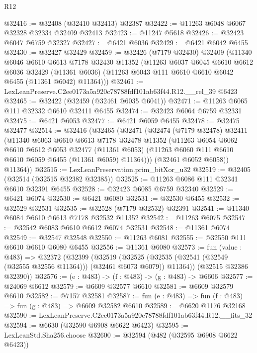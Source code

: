 \begin{lexlean}{R12}
\begin{coremodule}
@32416 := @32408 (@32410 @32413) @32387
@32422 := @11263 @6048 @6067 @32328 @32334 @32409 @32413
@32423 := @11247 @5618
@32426 := @32423 @6047 @6759 @32327
@32427 := @6421 @6036
@32429 := @6421 @6042 @6455
@32430 := @32427 @32429
@32459 := @32426
    (@7179 @32430)
    @32409
    (@11340
      @6046
      @6610
      @6613
      @7178
      @32430
      @11352
      (@11263
        @6037
        @6045
        @6610
        @6612
        @6036
        @32429
        (@11361 @6036)
        (@11263 @6043 @111 @6610 @6610 @6042 @6455 (@11361 @6042) @11364)))
@32461 := LexLeanPreserve.C2ee0173a5a920c78788fdf101ab63f44.R12.__rel_39 @6423
@32465 := @32422 (@32459 (@32461 @6035 @6041))
@32471 := @11263 @6065 @111 @32332 @6610 @32411 @6455
@32474 := @32423 @6064 @6759 @32331
@32475 := @6421 @6053
@32477 := @6421 @6059 @6455
@32478 := @32475 @32477
@32514 := @32416
    (@32465
      (@32471
        (@32474
          (@7179 @32478)
          @32411
          (@11340
            @6063
            @6610
            @6613
            @7178
            @32478
            @11352
            (@11263
              @6054
              @6062
              @6610
              @6612
              @6053
              @32477
              (@11361 @6053)
              (@11263 @6060 @111 @6610 @6610 @6059 @6455 (@11361 @6059) @11364)))
          (@32461 @6052 @6058))
        @11364))
@32515 := LexLeanPreservation.prim_bitXor_u32
@32519 := @32405 (@32514 (@32515 @32382 @32385))
@32525 := @11263 @6086 @111 @32341 @6610 @32391 @6455
@32528 := @32423 @6085 @6759 @32340
@32529 := @6421 @6074
@32530 := @6421 @6080
@32531 := @32530 @6455
@32532 := @32529 @32531
@32535 := @32528 (@7179 @32532) @32391
@32541 := @11340 @6084 @6610 @6613 @7178 @32532 @11352
@32542 := @11263 @6075
@32547 := @32542 @6083 @6610 @6612 @6074 @32531
@32548 := @11361 @6074
@32549 := @32547 @32548
@32550 := @11263 @6081
@32555 := @32550 @111 @6610 @6610 @6080 @6455
@32556 := @11361 @6080
@32573 := fun (value : @483) =>
  @32372
    (@32399
      (@32519
        (@32525 (@32535 (@32541 (@32549 (@32555 @32556 @11364))) (@32461 @6073 @6079)) @11364))
      (@32515 @32386 @32390))
@32576 := (e : @483) -> (f : @483) -> (g : @483) -> @6606
@32577 := @24069 @6612
@32579 := @6609 @32577 @6610
@32581 := @6609 @32579 @6610
@32582 := @7157 @32581
@32587 := fun (e : @483) => fun (f : @483) => fun (g : @483) => @6609 @32582 @6610
@32589 := @6620 @1176 @32168
@32590 := LexLeanPreserve.C2ee0173a5a920c78788fdf101ab63f44.R12.__fits_32
@32594 := @6630 (@32590 @6908 @6622 @6423)
@32595 := LexLeanStd.Sha256.choose
@32600 := @32594 (@482 (@32595 @6908 @6622 @6423))

\end{coremodule}
\end{lexlean}
